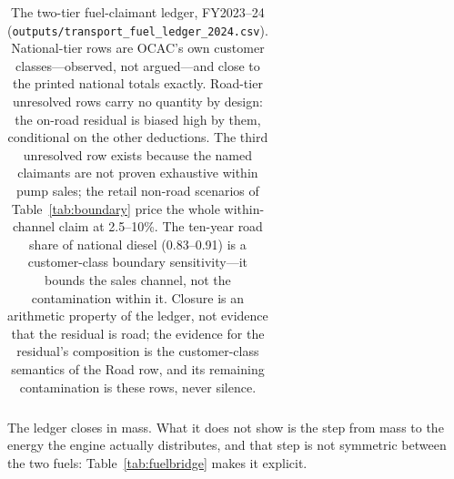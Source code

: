 \begin{table}[htbp]
\begin{tabular}{@{}llllrr@{}}
\bottomrule
\end{tabular}
\caption{The two-tier fuel-claimant ledger, FY2023--24
(\texttt{outputs/transport\_fuel\_ledger\_2024.csv}). National-tier rows are OCAC's own
customer classes---observed, not argued---and close to the printed national totals
exactly. Road-tier unresolved rows carry no quantity by design: the on-road residual is
biased high by them, conditional on the other deductions. The third unresolved row exists
because the named claimants are not proven exhaustive within pump sales; the retail
non-road scenarios of Table~\ref{tab:boundary} price the whole within-channel claim at
2.5--10\%. The ten-year road share of national diesel (0.83--0.91) is a customer-class
boundary sensitivity---it bounds the sales channel, not the contamination within it.
Closure is an arithmetic property of the ledger, not evidence that the residual is road;
the evidence for the residual's composition is the customer-class semantics of the Road
row, and its remaining contamination is these rows, never silence.}
\label{tab:ledger}
\end{table}

The ledger closes in mass. What it does not show is the step from mass to the energy
the engine actually distributes, and that step is not symmetric between the two fuels:
Table~\ref{tab:fuelbridge} makes it explicit.

